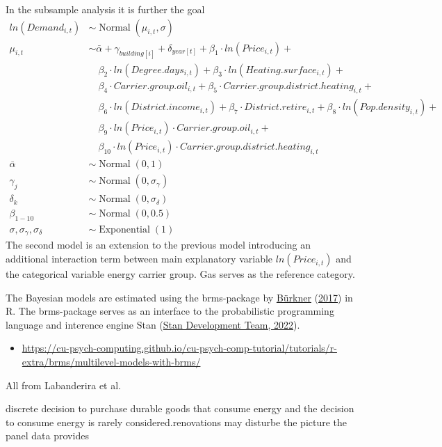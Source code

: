 \documentclass[12pt,twoside]{reedthesis}
\providecommand{\tightlist}{%
  \setlength{\itemsep}{0pt}\setlength{\parskip}{0pt}}
\begin{document}
In the subsample analysis it is further the goal
\begin{align*}
ln(Demand_{i,t}) & \sim \operatorname{Normal}(\mu_{i,t}, \sigma) \\
\mu_{i,t} & \sim \bar\alpha + \gamma_{building[i]} + \delta_{year[t]} + \beta_1 \cdot ln(Price_{i,t}) +  \\
 & \quad \beta_{2} \cdot ln(Degree.days_{i,t}) + \beta_{3} \cdot ln(Heating.surface_{i,t}) + \\
 & \quad \beta_{4} \cdot Carrier.group.oil_{i,t} + \beta_{5} \cdot Carrier.group.district.heating_{i,t} + \\
 & \quad \beta_{6} \cdot ln(District.income_{i,t}) + \beta_{7} \cdot District.retire_{i,t} + \beta_{8} \cdot ln(Pop.density_{i,t}) + \\
 & \quad \beta_{9} \cdot ln(Price_{i,t}) \cdot Carrier.group.oil_{i,t} + \\
 & \quad \beta_{10} \cdot ln(Price_{i,t}) \cdot Carrier.group.district.heating_{i,t} \\
\bar\alpha & \sim \operatorname{Normal}(0, 1) \\
\gamma_j & \sim \operatorname{Normal}(0, \sigma_{\gamma}) \\
\delta_k & \sim \operatorname{Normal}(0, \sigma_{\delta}) \\
\beta_{1-10} & \sim \operatorname{Normal}(0, 0.5) \\
\sigma, \sigma_{\gamma}, \sigma_{\delta} & \sim \operatorname{Exponential}(1)
\end{align*}
The second model is an extension to the previous model introducing an additional interaction term between main explanatory variable \(ln(Price_{i,t})\) and the categorical variable energy carrier group. Gas serves as the reference category.

The Bayesian models are estimated using the brms-package by \protect\hyperlink{ref-burkner17}{Bürkner} (\protect\hyperlink{ref-burkner17}{2017}) in R. The brms-package serves as an interface to the probabilistic programming language and interence engine Stan (\protect\hyperlink{ref-standevelopmentteam22}{Stan Development Team, 2022}).
\begin{itemize}
\tightlist
\item
  \url{https://cu-psych-computing.github.io/cu-psych-comp-tutorial/tutorials/r-extra/brms/multilevel-models-with-brms/}
\end{itemize}
All from Labanderira et al.

discrete decision to purchase durable goods that consume energy and the decision to consume energy is rarely considered.renovations may disturbe the picture the panel data provides
\end{document}

